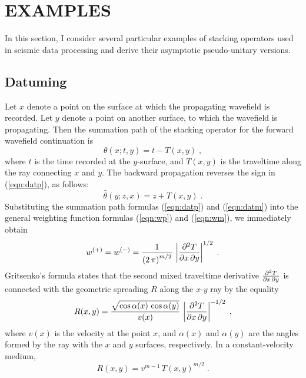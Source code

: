 \section{EXAMPLES}
In this section, I consider several particular examples of stacking
operators used in seismic data processing and derive their asymptotic
pseudo-unitary versions.

\subsection{Datuming}
Let $x$ denote a point on the surface at which the propagating
wavefield is recorded. Let $y$ denote a point on another surface, to
which the wavefield is propagating. Then the summation path of the
stacking operator for the forward wavefield continuation is
\begin{equation}
\theta(x;t,y)  =  t - T(x,y)\;,
\label{eqn:datp}
\end{equation}
where $t$ is the time recorded at the $y$-surface, and $T(x,y)$ is the
traveltime along the ray connecting $x$ and $y$. The backward
propagation reverses the sign in (\ref{eqn:datp}), as follows:
\begin{equation}
\widehat{\theta}(y;z,x)  =  z + T(x,y)\;.
\label{eqn:datm}
\end{equation}
Substituting the summation path formulas (\ref{eqn:datp}) and (\ref{eqn:datm}) into
the general weighting function formulas (\ref{eqn:wp}) and (\ref{eqn:wm}), we
immediately obtain
\begin{equation}
w^{(+)}  =  w^{(-)}  =  {1\over{\left(2\,\pi\right)^{m/2}}} \, 
\left|{{\partial^2 T}\over{\partial x\,\partial y}}\right|^{1/2}\;.
\label{eqn:datw}
\end{equation}
Gritsenko's formula \cite[]{gritsenko,ig1} states that the second mixed
traveltime derivative ${{\partial^2 T}\over{\partial x\,\partial y}}$
is connected with the geometric spreading $R$ along the $x$-$y$ ray by
the equality
\begin{equation}
R(x,y) = {\sqrt{\cos{\alpha(x)}\,\cos{\alpha(y)}}\over v(x)}\,
\left|{{\partial^2 T}\over{\partial x\,\partial y}}\right|^{-1/2}\;,
\label{eqn:gritsenko}
\end{equation}
where $v(x)$ is the velocity at the point $x$, and $\alpha(x)$ and
$\alpha(y)$ are the angles formed by the ray with the $x$ and $y$
surfaces, respectively. In a constant-velocity medium,
\begin{equation}
R(x,y) = v^{m-1}\,T(x,y)^{m/2}\;.
\end{equation}
